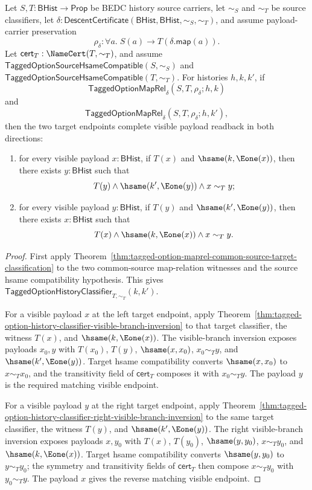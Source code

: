\begin{theorem}
\label{thm:tagged-option-maprel-common-source-visible-target-completion}
Let $S,T:\mathsf{BHist}\to\mathsf{Prop}$ be BEDC history source carriers, let
$\sim_S$ and $\sim_T$ be source classifiers, let
$\delta:\mathsf{DescentCertificate}(\mathsf{BHist},\mathsf{BHist},\sim_S,\sim_T)$,
and assume payload-carrier preservation
$$
\rho_{\delta}:\forall a.\;S(a)\to T(\delta.\mathsf{map}(a)).
$$
Let $\mathsf{cert}_T:\NameCert(T,\sim_T)$, and assume
$\mathsf{TaggedOptionSourceHsameCompatible}(S,\sim_S)$ and
$\mathsf{TaggedOptionSourceHsameCompatible}(T,\sim_T)$. For histories
$h,k,k'$, if
$$
\mathsf{TaggedOptionMapRel}_{\delta}(S,T,\rho_{\delta};h,k)
$$
and
$$
\mathsf{TaggedOptionMapRel}_{\delta}(S,T,\rho_{\delta};h,k'),
$$
then the two target endpoints complete visible payload readback in both
directions:
\begin{enumerate}
  \item for every visible payload $x:\mathsf{BHist}$, if $T(x)$ and
  $\hsame(k,\Eone(x))$, then there exists $y:\mathsf{BHist}$ such that
  $$
  T(y)\land\hsame(k',\Eone(y))\land x\sim_T y;
  $$
  \item for every visible payload $y:\mathsf{BHist}$, if $T(y)$ and
  $\hsame(k',\Eone(y))$, then there exists $x:\mathsf{BHist}$ such that
  $$
  T(x)\land\hsame(k,\Eone(x))\land x\sim_T y.
  $$
\end{enumerate}
\end{theorem}
\begin{proof}
First apply
Theorem~\ref{thm:tagged-option-maprel-common-source-target-classification} to
the two common-source map-relation witnesses and the source hsame compatibility
hypothesis. This gives
$\mathsf{TaggedOptionHistoryClassifier}_{T,\sim_T}(k,k')$.

For a visible payload $x$ at the left target endpoint, apply
Theorem~\ref{thm:tagged-option-history-classifier-visible-branch-inversion} to
that target classifier, the witness $T(x)$, and $\hsame(k,\Eone(x))$. The
visible-branch inversion exposes payloads $x_0,y$ with $T(x_0)$, $T(y)$,
$\hsame(x,x_0)$, $x_0\sim_T y$, and $\hsame(k',\Eone(y))$. Target hsame
compatibility converts $\hsame(x,x_0)$ to $x\sim_T x_0$, and the transitivity
field of $\mathsf{cert}_T$ composes it with $x_0\sim_T y$. The payload $y$ is
the required matching visible endpoint.

For a visible payload $y$ at the right target endpoint, apply
Theorem~\ref{thm:tagged-option-history-classifier-right-visible-branch-inversion}
to the same target classifier, the witness $T(y)$, and
$\hsame(k',\Eone(y))$. The right visible-branch inversion exposes payloads
$x,y_0$ with $T(x)$, $T(y_0)$, $\hsame(y,y_0)$, $x\sim_T y_0$, and
$\hsame(k,\Eone(x))$. Target hsame compatibility converts $\hsame(y,y_0)$ to
$y\sim_T y_0$; the symmetry and transitivity fields of $\mathsf{cert}_T$ then
compose $x\sim_T y_0$ with $y_0\sim_T y$. The payload $x$ gives the reverse
matching visible endpoint.
\end{proof}

